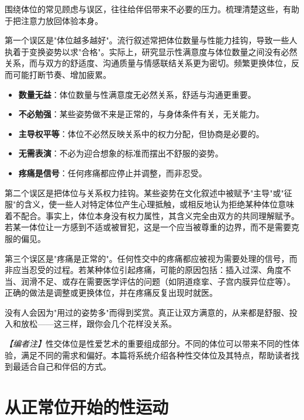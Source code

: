 \documentclass[12pt,UTF8]{ctexbook}
\newcommand{\keyword}[1]{\textbf{#1}}
\begin{document}
围绕体位的常见顾虑与误区，往往给伴侣带来不必要的压力。梳理清楚这些，有助于把注意力放回体验本身。

第一个误区是"体位越多越好"。流行叙述常把体位数量与性能力挂钩，导致一些人执着于变换姿势以求"合格"。实际上，研究显示性满意度与体位数量之间没有必然关系，而与双方的舒适度、沟通质量与情感联结关系更为密切。频繁更换体位，反而可能打断节奏、增加疲累。

\begin{itemize}
	\item \keyword{数量无益}：体位数量与性满意度无必然关系，舒适与沟通更重要。
	\item \keyword{不必勉强}：某些姿势做不来是正常的，与身体条件有关，无关能力。
	\item \keyword{主导权平等}：体位不必然反映关系中的权力分配，但协商是必要的。
	\item \keyword{无需表演}：不必为迎合想象的标准而摆出不舒服的姿势。
	\item \keyword{疼痛是信号}：任何疼痛都应停止并调整，而非忍受。
\end{itemize}

第二个误区是把体位与关系权力挂钩。某些姿势在文化叙述中被赋予"主导"或"征服"的含义，使一些人对特定体位产生心理抵触，或相反地认为拒绝某种体位意味着不配合。事实上，体位本身没有权力属性，其含义完全由双方的共同理解赋予。若某一体位让一方感到不适或被冒犯，这是一个应当被尊重的边界，而不是需要克服的偏见。

第三个误区是"疼痛是正常的"。任何性交中的疼痛都应被视为需要处理的信号，而非应当忍受的过程。若某种体位引起疼痛，可能的原因包括：插入过深、角度不当、润滑不足、或存在需要医学评估的问题（如阴道痉挛、子宫内膜异位症等）。正确的做法是调整或更换体位，并在疼痛反复出现时就医。

\begin{tcolorbox}[colback=pink!5!white,colframe=red!50!black,title=贴心小叮咛]
	没有人会因为"用过的姿势多"而得到奖赏。真正让双方满意的，从来都是舒服、投入和放松——这三样，跟你会几个花样没关系。
\end{tcolorbox}

\noindent\textit{【编者注】}性交体位是性爱艺术的重要组成部分。不同的体位可以带来不同的性体验，满足不同的需求和偏好。本篇将系统介绍各种性交体位及其特点，帮助读者找到最适合自己和伴侣的方式。

\vspace{0.5em}
\section{从正常位开始的性运动}
\end{document}
